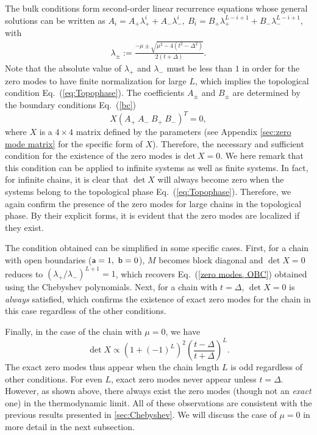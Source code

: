 \documentclass[aps, prb, showpacs, twocolumn, %
amssymb,superscriptaddress]{revtex4}
\begin{document}
The bulk conditions form second-order linear recurrence equations whose general solutions can be written as $A_{i} = A_{+} \lambda_{+}^{i} + A_{-} \lambda_{-}^{i},~B_{i} = B_{+} \lambda_{+}^{L-i+1} + B_{-} \lambda_{-}^{L-i+1}$, with
\begin{align}
\lambda_{\pm} := \frac{- \mu \pm \sqrt{\mu^{2} - 4 \left( t^{2} - \Delta^{2} \right)}}{2 \left( t + \Delta \right)}.
\end{align}
Note that the absolute value of $\lambda_{+}$ and $\lambda_{-}$ must be less than $1$ in order for the zero modes to have finite normalization for large $L$, which implies the topological condition Eq.~(\ref{eq:Topophase}). The coefficients $A_\pm$ and $B_\pm$ are determined by the boundary conditions Eq.~(\ref{bc})
\begin{equation}
X \left( A_{+} ~ A_{-} ~ B_{+} ~ B_{-} \right)^{T} = 0,
	\label{zero mode matrix}
\end{equation}
where $X$ is a $4 \times 4$ matrix defined by the parameters (see Appendix \ref{sec:zero mode matrix} for the specific form of $X$). Therefore, the necessary and sufficient condition for the existence of the zero modes is $\mathrm{det}~X = 0$. We here remark that this condition can be applied to infinite systems as well as finite systems. In fact, for infinite chains, it is clear that $\det X$ will always become zero when the systems belong to the topological phase Eq.~(\ref{eq:Topophase}). Therefore, we again confirm the presence of the zero modes for large chains in the topological phase. By their explicit forms, it is evident that the zero modes are localized if they exist.


The condition obtained can be simplified in some specific cases. First, for a chain with open boundaries (${\sf a}=1,~{\sf b}=0$), $M$ becomes block diagonal and
$\det X = 0$ reduces to $\left( \lambda_{+} / \lambda_{-} \right)^{L+1} = 1$, which recovers Eq.~(\ref{zero modes, OBC}) obtained using the Chebyshev polynomials. Next, for a chain with $t=\Delta$, $\det X = 0$ is \textit{always} satisfied, which confirms the existence of exact zero modes for the chain in this case regardless of the other conditions.


Finally, in the case of the chain with $\mu=0$, we have
\begin{equation}
\det X \propto \left( 1 + \left( -1 \right)^{L} \right)^{2} \left( \frac{t-\Delta}{t+\Delta} \right)^{L}.
\end{equation}
The exact zero modes thus appear when the chain length $L$ is odd regardless of other conditions. For even $L$, exact zero modes never appear unless $t=\Delta$. However, as shown above, there always exist the zero modes (though not an \textit{exact} one) in the thermodynamic limit. All of these observations are consistent with the previous results presented in \ref{sec:Chebyshev}. We will discuss the case of $\mu=0$ in more detail in the next subsection.
\end{document}
